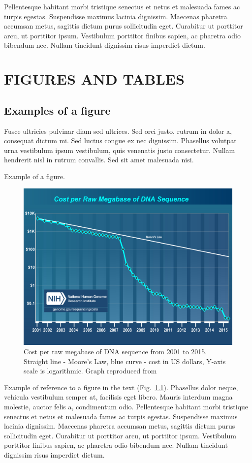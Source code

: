 Pellentesque habitant morbi tristique senectus et netus et malesuada fames ac turpis egestas. Suspendisse maximus lacinia dignissim. Maecenas pharetra accumsan metus, sagittis dictum purus sollicitudin eget. Curabitur ut porttitor arcu, ut porttitor ipsum. Vestibulum porttitor finibus sapien, ac pharetra odio bibendum nec. Nullam tincidunt dignissim risus imperdiet dictum.

\chapter{FIGURES AND TABLES}
\section{Examples of a figure}
Fusce ultricies pulvinar diam sed ultrices. Sed orci justo, rutrum in dolor a, consequat dictum mi. Sed luctus congue ex nec dignissim. Phasellus volutpat urna vestibulum ipsum vestibulum, quis venenatis justo consectetur. Nullam hendrerit nisl in rutrum convallis. Sed sit amet malesuada nisi.

Example of a figure.
\begin{figure}[ht!]
\begin{center}
\includegraphics[scale=0.5]{costperMb2015_4.jpg}
\end{center}
\caption[Cost per raw megabase of DNA sequence from 2001 to 2015]{Cost per raw megabase of DNA sequence from 2001 to 2015. Straight line - Moore's Law, blue curve - cost in US dollars, Y-axis scale is logarithmic. Graph reproduced from \citep{wetterstrand2016}}
\label{fig_dna_cost}
\end{figure}
Example of reference to a figure in the text (Fig.~\ref{fig_dna_cost}). Phasellus dolor neque, vehicula vestibulum semper at, facilisis eget libero. Mauris interdum magna molestie, auctor felis a, condimentum odio. Pellentesque habitant morbi tristique senectus et netus et malesuada fames ac turpis egestas. Suspendisse maximus lacinia dignissim. Maecenas pharetra accumsan metus, sagittis dictum purus sollicitudin eget. Curabitur ut porttitor arcu, ut porttitor ipsum. Vestibulum porttitor finibus sapien, ac pharetra odio bibendum nec. Nullam tincidunt dignissim risus imperdiet dictum.

